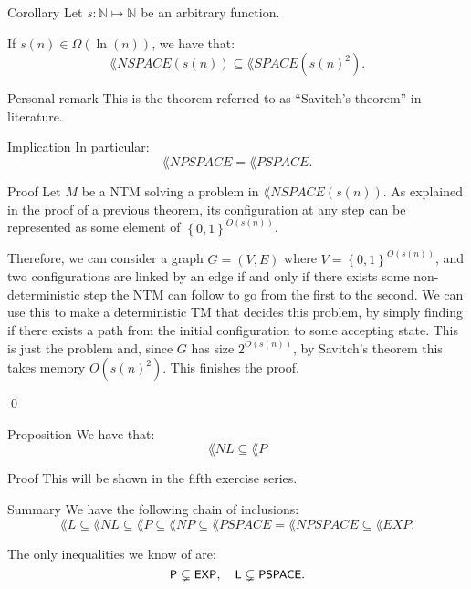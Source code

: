 \documentclass[a4paper]{article}
\begin{document}
\begin{parag}{Corollary}
    Let $s: \mathbb{N} \mapsto \mathbb{N}$ be an arbitrary function.

    If $s\left(n\right) \in \Omega\left(\ln\left(n\right)\right)$, we have that:
    \[\lang{NSPACE}\left(s\left(n\right)\right) \subseteq \lang{SPACE}\left(s\left(n\right)^2\right).\]
    
    \begin{subparag}{Personal remark}
        This is the theorem referred to as ``Savitch's theorem'' in literature. 
    \end{subparag}

    \begin{subparag}{Implication}
        In particular: 
        \[\lang{NPSPACE} = \lang{PSPACE}.\]
    \end{subparag}

    \begin{subparag}{Proof}
        Let $M$ be a NTM solving a problem in $\lang{NSPACE}\left(s\left(n\right)\right)$. As explained in the proof of a previous theorem, its configuration at any step can be represented as some element of $\left\{0, 1\right\}^{O\left(s\left(n\right)\right)}$.

        Therefore, we can consider a graph $G = \left(V, E\right)$ where $V = \left\{0, 1\right\}^{O\left(s\left(n\right)\right)}$, and two configurations are linked by an edge if and only if there exists some non-deterministic step the NTM can follow to go from the first to the second. We can use this to make a deterministic TM that decides this problem, by simply finding if there exists a path from the initial configuration to some accepting state. This is just the problem  and, since $G$ has size $2^{O\left(s\left(n\right)\right)}$, by Savitch's theorem this takes memory $O\left(s\left(n\right)^2\right)$. This finishes the proof.

        \qed
    \end{subparag}
\end{parag}

\begin{parag}{Proposition}
    We have that: 
    \[\lang{NL} \subseteq \lang{P}\]
    
    \begin{subparag}{Proof}
        This will be shown in the fifth exercise series.
    \end{subparag}
\end{parag}

\begin{parag}{Summary}
    We have the following chain of inclusions: 
    \[\lang{L} \subseteq \lang{NL} \subseteq \lang{P} \subseteq \lang{NP} \subseteq \lang{PSPACE} = \lang{NPSPACE} \subseteq \lang{EXP}.\]

    The only inequalities we know of are: 
    \[\lang{P} \subsetneq \lang{EXP}, \mathspace \lang{L} \subsetneq \lang{PSPACE}.\]
\end{parag}
\end{document}
